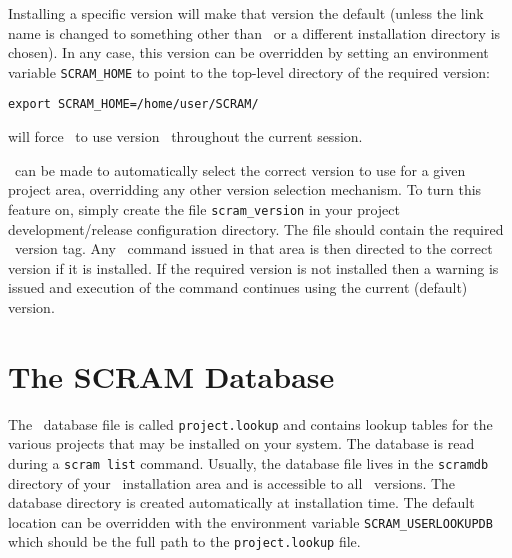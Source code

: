\ni Installing a specific version will make that version the default
(unless the link name is changed to something other than \scram\ or
a different installation directory is chosen).
In any case, this version can be overridden by
setting an environment variable \texttt{SCRAM\_HOME} to point to the
top-level directory of the required version:\mbox{}

\eg \texttt{export SCRAM\_HOME=/home/user/SCRAM/\lastrelease}

\ni will force \scram\ to use version \lastrelease\ throughout the current
session.

\ni \scram\ can be made to automatically select the correct version to
use for a given project area, overridding any other version selection
mechanism. To turn this feature on, simply create the file
\texttt{scram\_version} in your project development/release
configuration directory. The file should contain the required \scram\
version tag. Any \scram\ command issued in that area is then directed
to the correct version if it is installed. If the required version is
not installed then a warning is issued and execution of the command
continues using the current (default) version.

\section{The SCRAM Database} 
The \scram\ database file is called \texttt{project.lookup} and 
contains lookup tables for the various projects that may be 
installed on your system. The database is read
during a \texttt{scram list} command.  Usually, the database file
lives in the \texttt{scramdb} directory of
your \scram\ installation area and is accessible to all \scram\
versions. The database directory is created automatically at
installation time. The default location can be overridden with the
environment variable \texttt{SCRAM\_USERLOOKUPDB} which should be the
full path to the \texttt{project.lookup} file.

